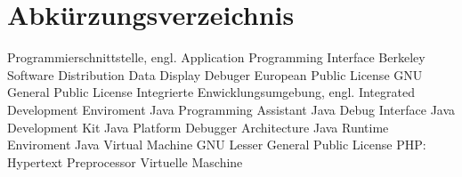 
\chapter*{Abkürzungsverzeichnis}

\begin{acronym}
	 {Programmierschnittstelle, engl. Application Programming Interface}
	 {Berkeley Software Distribution}
	 {Data Display Debuger}
	 {European Public License}
	 {GNU General Public License}
	 {Integrierte Enwicklungsumgebung, engl. Integrated Development Enviroment}
	 {Java Programming Assistant}
	 {Java Debug Interface}
	 {Java Development Kit}
	 {Java Platform Debugger Architecture}
	 {Java Runtime Enviroment}
	 {Java Virtual Machine}
	 {GNU Lesser General Public License}
	 {PHP: Hypertext Preprocessor}
	 {Virtuelle Maschine}
\end{acronym}
